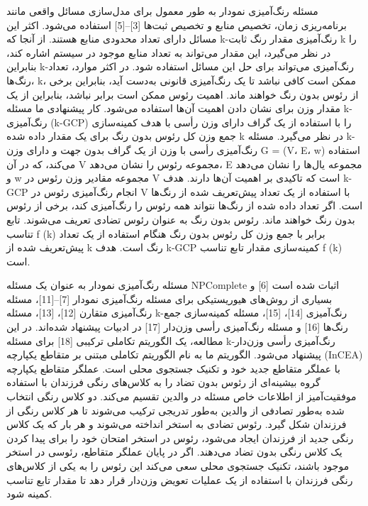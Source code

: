 \documentclass[a4paper,10pt]{article}
\begin{document}
        مسئله رنگ‌آمیزی نمودار به طور معمول برای مدل‌سازی مسائل واقعی مانند برنامه‌ریزی زمان، تخصیص منابع و تخصیص ثبت‌ها [3]–[5] استفاده می‌شود. اکثر این مسائل دارای تعداد محدودی منابع هستند. از آنجا که k-رنگ‌آمیزی مقدار رنگ ثابت k را در نظر می‌گیرد، این مقدار می‌تواند به تعداد منابع موجود در سیستم اشاره کند، بنابراین k-رنگ‌آمیزی می‌تواند برای حل این مسائل استفاده شود. در اکثر موارد، تعداد رنگ‌ها، k، ممکن است کافی نباشد تا یک رنگ‌آمیزی قانونی به‌دست آید، بنابراین برخی از رئوس بدون رنگ خواهند ماند. اهمیت رئوس ممکن است برابر نباشد، بنابراین از یک مقدار وزن برای نشان دادن اهمیت آن‌ها استفاده می‌شود. کار پیشنهادی ما مسئله k-رنگ‌آمیزی (k-GCP) را با استفاده از یک گراف دارای وزن رأسی با هدف کمینه‌سازی جمع وزن کل رئوس بدون رنگ برای یک مقدار داده شده k در نظر می‌گیرد. مسئله k-رنگ‌آمیزی رأسی با وزن از یک گراف بدون جهت و دارای وزن G = (V، E، w) استفاده می‌کند، که در آن V مجموعه رئوس را نشان می‌دهد، E مجموعه یال‌ها را نشان می‌دهد و w مجموعه مقادیر وزن رئوس در V است که تاکیدی بر اهمیت آن‌ها دارند. هدف k-GCP انجام رنگ‌آمیزی رئوس در V با استفاده از یک تعداد پیش‌تعریف شده از رنگ‌ها است. اگر تعداد داده شده از رنگ‌ها نتواند همه رئوس را رنگ‌آمیزی کند، برخی از رئوس بدون رنگ خواهند ماند. رئوس بدون رنگ به عنوان رئوس تضادی تعریف می‌شوند. تابع تناسب f (k) برابر با جمع وزن کل رئوس بدون رنگ هنگام استفاده از یک تعداد پیش‌تعریف شده از k رنگ است. هدف k-GCP کمینه‌سازی مقدار تابع تناسب f (k) است.

        مسئله رنگ‌آمیزی نمودار به عنوان یک مسئله NPComplete اثبات شده است [6] و بسیاری از روش‌های هیوریستیکی برای مسئله رنگ‌آمیزی نمودار [7]–[11]، مسئله رنگ‌آمیزی متقارن [12]، [13]، مسئله k-رنگ‌آمیزی [14]، [15]، مسئله کمینه‌سازی جمع رنگ‌ها [16] و مسئله رنگ‌آمیزی رأسی وزن‌دار [17] در ادبیات پیشنهاد شده‌اند. در این مطالعه، یک الگوریتم تکاملی ترکیبی [18] برای مسئله k-رنگ‌آمیزی رأسی وزن‌دار پیشنهاد می‌شود. الگوریتم ما به نام الگوریتم تکاملی مبتنی بر متقاطع یکپارچه (InCEA) با عملگر متقاطع جدید خود و تکنیک جستجوی محلی است. عملگر متقاطع یکپارچه گروه بیشینه‌ای از رئوس بدون تضاد را به کلاس‌های رنگی فرزندان با استفاده موفقیت‌آمیز از اطلاعات خاص مسئله در والدین تقسیم می‌کند. دو کلاس رنگی انتخاب شده به‌طور تصادفی از والدین به‌طور تدریجی ترکیب می‌شوند تا هر کلاس رنگی از فرزندان شکل گیرد. رئوس تضادی به استخر انداخته می‌شوند و هر بار که یک کلاس رنگی جدید از فرزندان ایجاد می‌شود، رئوس در استخر امتحان خود را برای پیدا کردن یک کلاس رنگی بدون تضاد می‌دهند. اگر در پایان عملگر متقاطع، رئوسی در استخر موجود باشند، تکنیک جستجوی محلی سعی می‌کند این رئوس را به یکی از کلاس‌های رنگی فرزندان با استفاده از یک عملیات تعویض وزن‌دار قرار دهد تا مقدار تابع تناسب کمینه شود.
\end{document}
